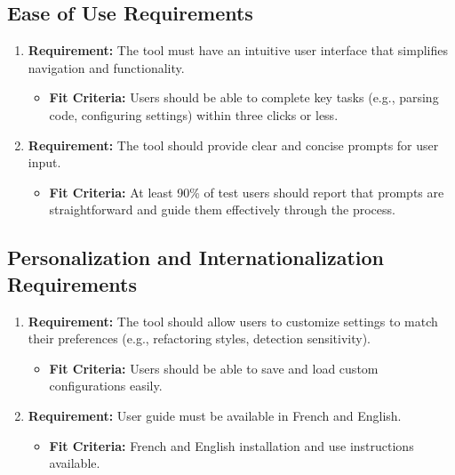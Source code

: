 \documentclass[12pt]{article}
\begin{document}
\subsection{Ease of Use Requirements}
\begin{enumerate}
  \item \textbf{Requirement:} The tool must have an intuitive user interface that simplifies navigation and functionality.
  \begin{itemize}[label={}]
      \item \textbf{Fit Criteria:} Users should be able to complete key tasks (e.g., parsing code, configuring settings) within three clicks or less.
  \end{itemize}
  \item \textbf{Requirement:} The tool should provide clear and concise prompts for user input.
  \begin{itemize}[label={}]
      \item \textbf{Fit Criteria:} At least 90\% of test users should report that prompts are straightforward and guide them effectively through the process.
  \end{itemize}
\end{enumerate}
\subsection{Personalization and Internationalization Requirements}
\begin{enumerate}
  \item \textbf{Requirement:} The tool should allow users to customize settings to match their preferences (e.g., refactoring styles, detection sensitivity).
  \begin{itemize}[label={}]
      \item \textbf{Fit Criteria:} Users should be able to save and load custom configurations easily.
  \end{itemize}
  \item \textbf{Requirement:} User guide must be available in French and English.
  \begin{itemize}[label={}]
      \item \textbf{Fit Criteria:} French and English installation and use instructions available.
  \end{itemize} 
\end{enumerate}
\end{document}
